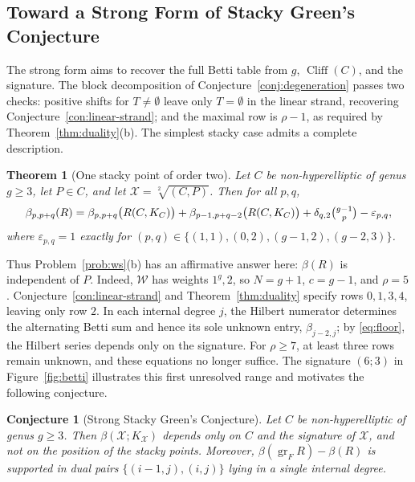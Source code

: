 \documentclass[11pt,reqno]{amsart}
\newtheorem{theorem}[lemma]{Theorem}
\newtheorem{conjecture}[lemma]{Conjecture}
\theoremstyle{remark}
\newcommand{\cliff}{\operatorname{Cliff}}
\newcommand{\cW}{\mathcal{W}}
\newcommand{\cX}{\mathcal{X}}
\begin{document}
\subsection{Toward a Strong Form of Stacky Green's Conjecture}\label{subsec:middle}
The strong form aims to recover the full Betti table from $g$, $\cliff(C)$, and the signature. The block decomposition of Conjecture~\ref{conj:degeneration} passes two checks: positive shifts for $T\neq\emptyset$ leave only $T=\emptyset$ in the linear strand, recovering Conjecture~\ref{con:linear-strand}; and the maximal row is $\rho-1$, as required by Theorem~\ref{thm:duality}(b). The simplest stacky case admits a complete description.

\begin{theorem}[One stacky point of order two]\label{thm:order-two}
Let $C$ be non-hyperelliptic of genus $g\geq3$, let $P\in C$, and let $\cX=\sqrt[2]{(C,P)}$. Then for all $p,q$,
\[
\beta_{p,p+q}(R)
=\beta_{p,p+q}\big(R(C,K_C)\big)
+\beta_{p-1,p+q-2}\big(R(C,K_C)\big)
+\delta_{q,2}\tbinom{g-1}{p}
-\varepsilon_{p,q},
\]
where $\varepsilon_{p,q}=1$ exactly for
$(p,q)\in\{(1,1),(0,2),(g-1,2),(g-2,3)\}$.
\end{theorem}

Thus Problem~\ref{prob:ws}(b) has an affirmative answer here: $\beta(R)$ is independent of $P$. Indeed, $\cW$ has weights $1^g,2$, so $N=g+1$, $c=g-1$, and $\rho=5$. Conjecture~\ref{con:linear-strand} and Theorem~\ref{thm:duality} specify rows $0,1,3,4$, leaving only row $2$. In each internal degree $j$, the Hilbert numerator determines the alternating Betti sum and hence its sole unknown entry, $\beta_{j-2,j}$; by \eqref{eq:floor}, the Hilbert series depends only on the signature. For $\rho\geq7$, at least three rows remain unknown, and these equations no longer suffice. The signature $(6;3)$ in Figure~\ref{fig:betti} illustrates this first unresolved range and motivates the following conjecture.

\begin{conjecture}[Strong Stacky Green's Conjecture]\label{conj:middle}
Let $C$ be non-hyperelliptic of genus $g\geq3$. Then $\beta(\cX;K_{\cX})$ depends only on $C$ and the signature of $\cX$, and not on the position of the stacky points. Moreover, $\beta(\operatorname{gr}_FR)-\beta(R)$ is supported in dual pairs $\{(i-1,j),(i,j)\}$ lying in a single internal degree.
\end{conjecture}
\end{document}
